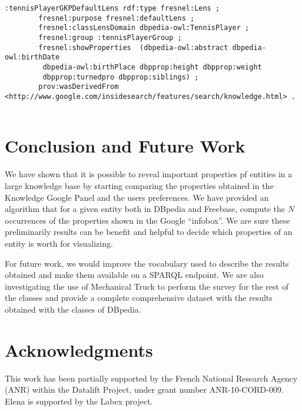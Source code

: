 \documentclass[runningheads,a4paper]{llncs}
\begin{document}
\begin{verbatim}
:tennisPlayerGKPDefaultLens rdf:type fresnel:Lens ;
		fresnel:purpose fresnel:defaultLens ;
		fresnel:classLensDomain dbpedia-owl:TennisPlayer ; 
		fresnel:group :tennisPlayerGroup ;
		fresnel:showProperties  (dbpedia-owl:abstract dbpedia-owl:birthDate
		 dbpedia-owl:birthPlace dbpprop:height dbpprop:weight 
		 dbpprop:turnedpro dbpprop:siblings) ;
		prov:wasDerivedFrom <http://www.google.com/insidesearch/features/search/knowledge.html> .
		
	\end{verbatim}	


\section{Conclusion and Future Work}
\label{sec:conclusion}
We have shown that it is possible to reveal important properties pf entities in a large knowledge base by starting comparing the properties obtained in the Knowledge Google Panel and the users preferences. We have provided an algorithm that for a given entity both in DBpedia and Freebase, compute the $N$ occurrences of the properties shown in the Google ``infobox''. We are sure these preliminarily results can be benefit and helpful to decide which properties of an entity is worth for visualizing.  

For future work, we would improve the vocabulary used to describe the results obtained and make them available on a SPARQL endpoint. We are also investigating the use of Mechanical Truck to perform the survey for the rest of the classes and provide a complete comprehensive dataset with the results obtained with the classes of DBpedia. 


\section*{Acknowledgments} \label{sec:acknowledgments}
This work has been partially supported by the French National Research Agency (ANR) within the Datalift Project, under grant number ANR-10-CORD-009. Elena is supported by the Labex project.



\nocite{*}

\end{document}
